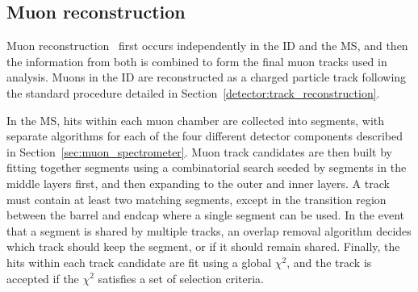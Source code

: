 \subsection{Muon reconstruction}\label{detector:muon_reconstruction}
Muon reconstruction~\cite{2014.muon-reconstruction-run1, 2016.muon-reconstruction-13tev} first occurs independently in the ID and the MS, and then the information from both is combined to form the final muon tracks used in analysis.
Muons in the ID are reconstructed as a charged particle track following the standard procedure detailed in Section~\ref{detector:track_reconstruction}.

In the MS, hits within each muon chamber are collected into segments, with separate algorithms for each of the four different detector components described in Section~\ref{sec:muon_spectrometer}.
Muon track candidates are then built by fitting together segments using a combinatorial search seeded by segments in the middle layers first, and then expanding to the outer and inner layers.
A track must contain at least two matching segments, except in the transition region between the barrel and endcap where a single segment can be used.
In the event that a segment is shared by multiple tracks, an overlap removal algorithm decides which track should keep the segment, or if it should remain shared.
Finally, the hits within each track candidate are fit using a global $\chi^2$, and the track is accepted if the $\chi^2$ satisfies a set of selection criteria.

